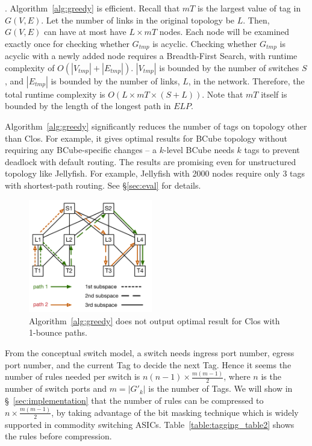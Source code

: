 . Algorithm~\ref{alg:greedy} is efficient. Recall that
$mT$ is the largest value of tag in $G(V,E)$. Let the number of links in the
original topology be $L$. Then, $G(V,E)$ can have at most have $L \times mT$
nodes.  Each node will be examined exactly once for checking whether $G_{tmp}$
is acyclic.  Checking whether $G_{tmp}$ is acyclic with a newly added node
requires a Breadth-First Search, with runtime complexity of $O(|V_{tmp}| +
|E_{tmp}|)$. $|V_{tmp}|$ is bounded by the number of switches $S$, and
$|E_{tmp}|$ is bounded by the number of links, $L$, in the network.  Therefore,
the total runtime complexity is $O(L \times mT \times (S+L))$. Note that $mT$
itself is bounded by the length of the longest path in $ELP$.

 Algorithm~\ref{alg:greedy} significantly reduces the
number of tags on topology other than Clos. For example, it gives optimal
results for BCube topology without requiring any BCube-specific changes -- a
$k$-level BCube needs $k$ tags to prevent deadlock with default routing. The
results are promising even for unstructured topology like Jellyfish.  For
example, Jellyfish with 2000 nodes require only 3 tags with shortest-path
routing. See \S\ref{sec:eval} for details.

\begin{figure}[t]
	\centering
	\includegraphics[width=0.48\textwidth] {figs/nonoptimal_example}
	\caption{Algorithm~\ref{alg:greedy} does not output optimal result for Clos with 1-bounce paths.}
	\label{fig:nonoptimal}
	\vspace{-1em}
\end{figure}

 From the conceptual switch model, a switch needs ingress
port number, egress port number, and the current Tag to decide the next Tag.
Hence it seems the number of rules needed per switch is $n(n-1)\times
\frac{m(m-1)}{2}$, where $n$ is the number of switch ports and $m=|G'_{k}|$ is
the number of Tags. We will show in \S~\ref{sec:implementation} that the number
of rules can be compressed to  $n\times \frac{m(m-1)}{2}$, by taking advantage
of the bit masking technique which is widely supported in commodity switching
ASICs. Table~\ref{table:tagging_table2} shows the rules before compression.

